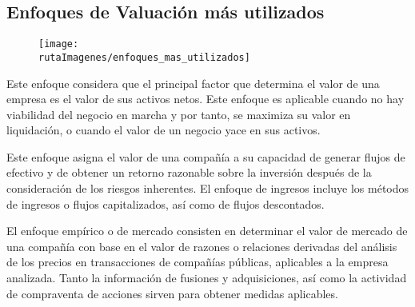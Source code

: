 \subsection{Enfoques de Valuaci\'on m\'as utilizados}

\begin{figure}[H]

\texttt{[image: \\rutaImagenes/enfoques\_mas\_utilizados]}
      
\end{figure}

 Este enfoque considera que el principal factor que determina el valor de una empresa es el valor de sus activos netos. Este enfoque es aplicable cuando no hay viabilidad del negocio en marcha y por tanto, se maximiza su valor en liquidación, o cuando el valor de un negocio yace en sus activos. 

 Este enfoque asigna el valor de una compañía a su capacidad de generar flujos de efectivo y de obtener un retorno razonable sobre la inversión después de la consideración de los riesgos inherentes. El enfoque de ingresos incluye los métodos de ingresos o flujos capitalizados, así como de flujos descontados.

 El enfoque empírico o de mercado consisten en determinar el valor de mercado de una compañía con base en el valor de razones o relaciones derivadas del análisis de los precios en transacciones de compañías públicas, aplicables a la empresa analizada. Tanto la información de fusiones y adquisiciones, así como la actividad de compraventa de acciones sirven para obtener medidas aplicables.

 